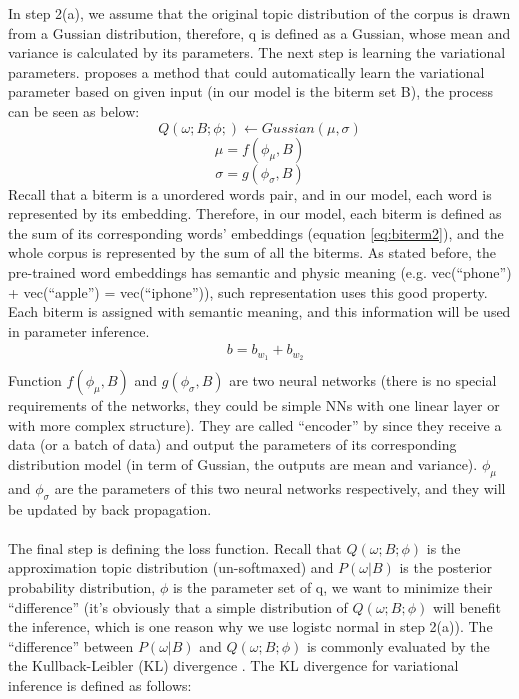 In step 2(a), we assume that the original topic distribution of the corpus is drawn from a Gussian distribution, therefore, q is defined as a Gussian, whose mean and variance is calculated by its parameters. The next step is learning the variational parameters. \cite{kingma2013auto} proposes a method that could automatically learn the variational parameter based on given input (in our model is the biterm set B), the process can be seen as below:
\begin{equation}
    Q(\omega;B;\phi;) \leftarrow Gussian(\mu,\sigma)
\label{eq:var1}
\end{equation}
\begin{equation}
    \mu = f(\phi_{\mu}, B)
\label{eq:var2}
\end{equation}
\begin{equation}
    \sigma = g(\phi_{\sigma}, B)
\label{eq:var3}
\end{equation}
Recall that a biterm is a unordered words pair, and in our model, each word is represented by its embedding. Therefore, in our model, each biterm is defined as the sum of its corresponding words' embeddings (equation \ref{eq:biterm2}), and the whole corpus is represented by the sum of all the biterms. As stated before, the pre-trained word embeddings has semantic and physic meaning (e.g. vec(``phone'') + vec(``apple'') = vec(``iphone'')), such representation uses this good property. Each biterm is assigned with semantic meaning, and this information will be used in parameter inference.
\begin{equation}
    \begin{aligned}
        & b = b_{w_1} + b_{w_2}\\
    \end{aligned}
\label{eq:biterm2}
\end{equation}
Function $f(\phi_{\mu}, B)$ and $g(\phi_{\sigma}, B)$ are two neural networks (there is no special requirements of the networks, they could be simple NNs with one linear layer or with more complex structure). They are called ``encoder'' by \cite{kingma2013auto} since they receive a data (or a batch of data) and output the parameters of its corresponding distribution model (in term of Gussian, the outputs are mean and variance). $\phi_{\mu}$ and $\phi_{\sigma}$ are the parameters of this two neural networks respectively, and they will be updated by back propagation.\\\\
The final step is defining the loss function. Recall that $Q(\omega;B;\phi)$ is the  approximation topic distribution (un-softmaxed) and $P(\omega|B)$ is the posterior probability distribution, $\phi$ is the parameter set of q, we want to minimize their ``difference'' (it's obviously that a simple distribution of $Q(\omega;B;\phi)$ will benefit the inference, which is one reason why we use logistc normal in step 2(a)). The ``difference'' between $P(\omega|B)$ and $Q(\omega;B;\phi)$ is commonly evaluated by the  the Kullback-Leibler (KL) divergence \cite{yang2017understanding}. The KL divergence for variational inference is defined as follows: 
